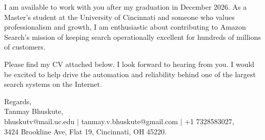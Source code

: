 \documentclass[11pt]{letter}
\begin{document}
\begin{letter}{}
I am available to work with you after my graduation in December 2026. As a Master's student at the University of Cincinnati and someone who values professionalism and growth, I am enthusiastic about contributing to Amazon Search's mission of keeping search operationally excellent for hundreds of millions of customers.

Please find my CV attached below. I look forward to hearing from you. I would be excited to help drive the automation and reliability behind one of the largest search systems on the Internet.

{\setlength{\parskip}{0pt}
Regards,\\
Tanmay Bhuskute,\\
bhuskutv@mail.uc.edu $\mid$ tanmay.v.bhuskute@gmail.com $\mid$ +1 7328583027,\\
3424 Brookline Ave, Flat 19, Cincinnati, OH 45220.
}

\end{letter}
\end{document}
